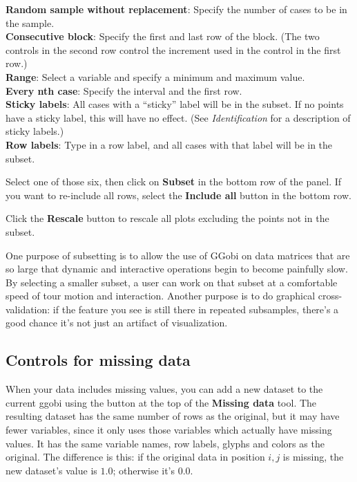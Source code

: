\documentclass[11pt]{article}
\begin{document}
{\bf Random sample without replacement}:  Specify the number of
     cases to be in the sample.
\\{\bf Consecutive block}:  Specify the first and last row of the block.
     (The two controls in the second row control the increment used
     in the control in the first row.)
\\{\bf Range}:  Select a variable and specify a minimum and maximum
     value.
\\{\bf Every nth case}:  Specify the interval and the first row.
\\{\bf Sticky labels}:  All cases with a ``sticky'' label will
  be in the subset.  If no points have a sticky label, this
  will have no effect. (See {\em Identification} for a description
  of sticky labels.)
\\{\bf Row labels}: Type in a row label, and all cases with that
  label will be in the subset.

Select one of those six, then click on {\bf Subset} in the
bottom row of the panel.  If you want to re-include all rows, 
select the {\bf Include all} button in the bottom row.

Click the {\bf Rescale} button to rescale all plots excluding
the points not in the subset.

One purpose of subsetting is to allow the use of GGobi on data matrices
that are so large that dynamic and interactive operations begin to
become painfully slow.  By selecting a smaller subset, a user can
work on that subset at a comfortable speed of tour motion and
interaction.  Another purpose is to do graphical cross-validation:
if the feature you see is still there in repeated subsamples, there's
a good chance it's not just an artifact of visualization.

\subsection{Controls for missing data}

When your data includes missing values, you can add a new dataset to the
current ggobi using the button at the top of the {\bf Missing data} tool.
The resulting dataset has the same number of rows as the original,
but it may have fewer variables, since it only uses those variables
which actually have missing values.  It has the same variable names,
row labels, glyphs and colors as the original.  The difference is this:
if the original data in position $i,j$ is missing, the new dataset's
value is $1.0$; otherwise it's $0.0$.
\end{document}
